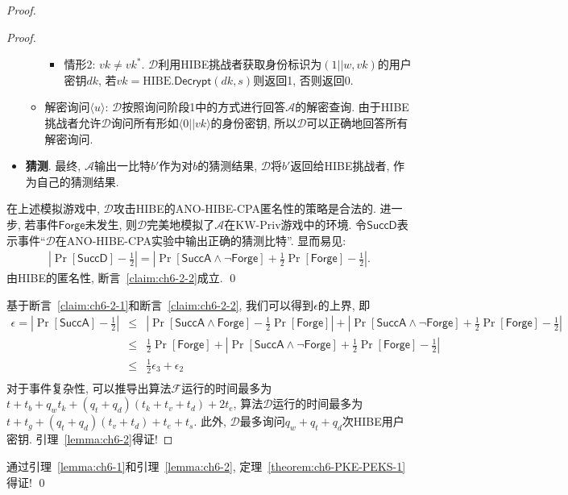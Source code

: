 \begin{proof}
\begin{proof}
\begin{trivlist}
\begin{itemize}
\begin{itemize}
\begin{itemize}
					\item 情形2: $vk \neq vk^*$. $\mathcal{D}$利用HIBE挑战者获取身份标识为$(1||w, vk)$的用户密钥$dk$, 若$vk = \text{HIBE}.\mathsf{Decrypt}(dk, s)$则返回1, 否则返回$0$.
				\end{itemize}
			
			\item 解密询问$\langle u \rangle$: $\mathcal{D}$按照询问阶段1中的方式进行回答$\mathcal{A}$的解密查询. 由于HIBE挑战者允许$\mathcal{D}$询问所有形如$\langle 0||vk \rangle$的身份密钥, 所以$\mathcal{D}$可以正确地回答所有解密询问.
		\end{itemize}

	\item \textbf{猜测}. 最终, $\mathcal{A}$输出一比特$b'$作为对$b$的猜测结果, $\mathcal{D}$将$b'$返回给HIBE挑战者, 作为自己的猜测结果. 	
\end{itemize}
	在上述模拟游戏中, $\mathcal{D}$攻击HIBE的ANO-HIBE-CPA匿名性的策略是合法的. 进一步, 若事件$\mathsf{Forge}$未发生, 则$\mathcal{D}$完美地模拟了$\mathcal{A}$在KW-Priv游戏中的环境. 令$\mathsf{SuccD}$表示事件``$\mathcal{D}$在ANO-HIBE-CPA实验中输出正确的猜测比特''. 显而易见:
\[
\begin{array}{l}
	|\Pr[\mathsf{SuccD}]-\frac{1}{2}| =
	|\Pr[\mathsf{SuccA} \wedge \neg\mathsf{Forge}] + \frac{1}{2}\Pr[\mathsf{Forge}] -\frac{1}{2}|.
\end{array}
\]
由HIBE的匿名性, 断言~\ref{claim:ch6-2-2}成立. \qed
\end{trivlist}

基于断言~\ref{claim:ch6-2-1}和断言~\ref{claim:ch6-2-2}, 我们可以得到$\epsilon$的上界, 即
\[
\begin{array}{lll}
\epsilon =	|\Pr[\mathsf{SuccA}] - \frac{1}{2}| & \leq & |\Pr[\mathsf{SuccA} \wedge \mathsf{Forge}] - \frac{1}{2}\Pr[\mathsf{Forge}]| + 
	       |\Pr[\mathsf{SuccA} \wedge \neg\mathsf{Forge}] + \frac{1}{2}\Pr[\mathsf{Forge}] - \frac{1}{2}|\\ 
	&\leq&  \frac{1}{2}\Pr[\mathsf{Forge}] + |\Pr[\mathsf{SuccA} \wedge \neg\mathsf{Forge}] + \frac{1}{2} \Pr[\mathsf{Forge}] - \frac{1}{2}|\\
&\leq&  \frac{1}{2}\epsilon_3 + \epsilon_2\\
\end{array}
\]
对于事件复杂性, 可以推导出算法$\mathcal{F}$运行的时间最多为$t + t_b + q_wt_k + (q_t+q_d)(t_k+t_v+t_d) + 2t_e$, 算法$\mathcal{D}$运行的时间最多为$t + t_g + (q_t+q_d)(t_v+t_d) + t_e + t_s$. 
此外, $\mathcal{D}$最多询问$q_w + q_t + q_d$次HIBE用户密钥.  引理~\ref{lemma:ch6-2}得证! 
\end{proof}
通过引理~\ref{lemma:ch6-1}和引理~\ref{lemma:ch6-2}, 定理~\ref{theorem:ch6-PKE-PEKS-1}得证! \qed 
\end{proof}



